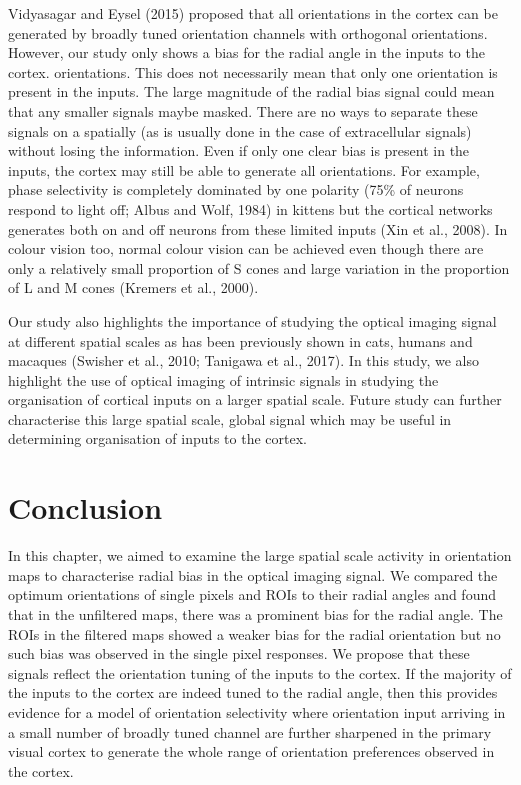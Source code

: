 		Vidyasagar and Eysel (2015) proposed that all orientations in the cortex can be generated by broadly tuned orientation channels with orthogonal orientations. However, our study only shows a bias for the radial angle in the inputs to the cortex. orientations. This does not necessarily mean that only one orientation is present in the inputs. The large magnitude of the radial bias signal could mean that any smaller signals maybe masked. There are no ways to separate these signals on a spatially (as is usually done in the case of extracellular signals) without losing the information. Even if only one clear bias is present in the inputs, the cortex may still be able to generate all orientations. For example, phase selectivity is completely dominated by one polarity (75\% of neurons respond to light off; Albus and Wolf, 1984) in kittens but the cortical networks generates both on and off neurons from these limited inputs (Xin et al., 2008). In colour vision too, normal colour vision can be achieved even though there are only a relatively small proportion of S cones and large variation in the proportion of L and M cones (Kremers et al., 2000).
	
		Our study also highlights the importance of studying the optical imaging signal at different spatial scales as has been previously shown in cats, humans and macaques (Swisher et al., 2010; Tanigawa et al., 2017). In this study, we also highlight the use of optical imaging of intrinsic signals in studying the organisation of cortical inputs on a larger spatial scale. Future study can further characterise this large spatial scale, global signal which may be useful in determining organisation of inputs to the cortex.
		\pagebreak
	\section{Conclusion}
	
		In this chapter, we aimed to examine the large spatial scale activity in orientation maps to characterise radial bias in the optical imaging signal. We compared the optimum orientations of single pixels and ROIs to their radial angles and found that in the unfiltered maps, there was a prominent bias for the radial angle. The ROIs in the filtered maps showed a weaker bias for the radial orientation but no such bias was observed in the single pixel responses. We propose that these signals reflect the orientation tuning of the inputs to the cortex. If the majority of the inputs to the cortex are indeed tuned to the radial angle, then this provides evidence for a model of orientation selectivity where orientation input arriving in a small number of broadly tuned channel are further sharpened in the primary visual cortex to generate the whole range of orientation preferences observed in the cortex. 
		